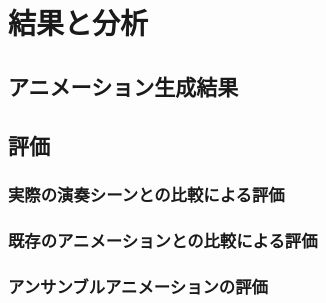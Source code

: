\chapter{結果と分析}
\label{chap:results}

\section{アニメーション生成結果}

\section{評価}

\subsection{実際の演奏シーンとの比較による評価}

\subsection{既存のアニメーションとの比較による評価}

\subsection{アンサンブルアニメーションの評価}